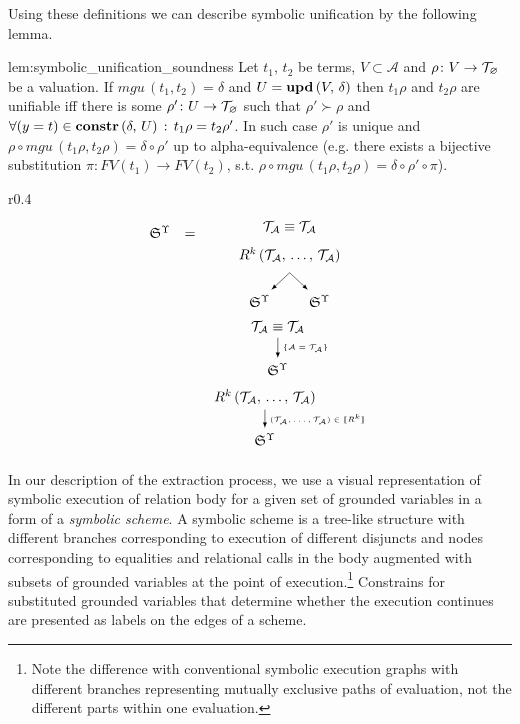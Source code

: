 Using these definitions we can describe symbolic unification by the following lemma.

\begin{replemma}{lem:symbolic_unification_soundness}
Let $t_1$, $t_2$ be terms,  $V \subset \mathcal{A}$ and $\rho \colon V \to \mathcal{T}_{\varnothing}$ be a valuation. If $mgu\,(t_1, t_2) = \delta$ and $U = \mbox{\textbf{upd}}\,(V,\, \delta) $  then $t_1 \rho$ and $t_2 \rho$ are unifiable iff there is some $\rho' \colon U \to \mathcal{T}_{\varnothing}$ such that $\rho' \succ \rho$ and $\forall (y = t) \in \mbox{\textbf{constr}}\,(\delta,\, U)\,:\, t_1 \rho = t_2 \rho'$.
In such case $\rho'$ is unique and $ \rho \circ mgu\,(t_1 \rho, t_2 \rho) = \delta\circ\rho' $ up to alpha-equivalence (e.g. there exists a bijective substitution $\pi : FV(t_1) \to FV(t_2)$, s.t. $ \rho \circ mgu\,(t_1 \rho, t_2 \rho) = \delta \circ\rho'\circ \pi$).
\end{replemma}

\begin{wrapfigure}{r}{0.4\textwidth}
\[\renewcommand{\arraystretch}{1}
\begin{array}{ccc}
  \schemewithvset{\mathfrak{S}}{\Upsilon} & = &\schemenode{$\unigoal{\mathcal{T}_\mathcal{A}}{\mathcal{T}_\mathcal{A}}$} \\
                                          &   &\schemenode{$\invokegoal{R^k}{\mathcal{T}_\mathcal{A}}{\mathcal{T}_\mathcal{A}}$} \\
                                          &   &\schemefork{$\schemewithvset{\mathfrak{S}}{\Upsilon}$}{$\schemewithvset{\mathfrak{S}}{\Upsilon}$} \\
                                          &   &\schemesarrow{$\unigoal{\mathcal{T}_\mathcal{A}}{\mathcal{T}_\mathcal{A}}$}{$\{\mathcal{A}=\mathcal{T}_\mathcal{A}\}$}{$\schemewithvset{\mathfrak{S}}{\Upsilon}$}\\
                                          &   &\schemedarrow{$\invokegoal{R^k}{\mathcal{T}_\mathcal{A}}{\mathcal{T}_\mathcal{A}}$}{$(\mathcal{T}_\mathcal{A}, \dots, \mathcal{T}_\mathcal{A}) \in \sembr{R^k}$}{$\schemewithvset{\mathfrak{S}}{\Upsilon}$} 
\end{array}\]
\caption{Symbolic Scheme Fragments}
\label{fig:scheme_fragments}
\end{wrapfigure}

In our description of the extraction process, we use a visual representation of symbolic execution of relation body for a given set of grounded variables in a form of a \emph{symbolic scheme}.
A symbolic scheme is a tree-like structure with different branches corresponding to execution of different disjuncts and nodes corresponding to equalities and relational calls in the body
augmented with subsets of grounded variables at the point of execution.\footnote{Note the difference with conventional symbolic execution graphs
with different branches representing mutually exclusive paths of evaluation, not the different parts within one evaluation.} Constrains for substituted
grounded variables that determine whether the execution continues are presented as labels on the edges of a scheme.



